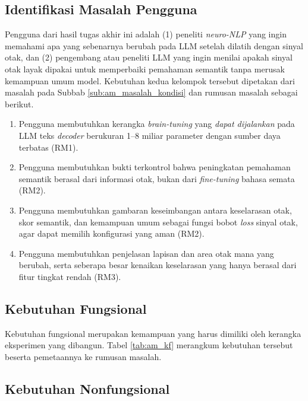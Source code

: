   \subsection{Identifikasi Masalah Pengguna}
  \label{sub:am_pengguna}

  Pengguna dari hasil tugas akhir ini adalah (1) peneliti \textit{neuro-NLP} yang ingin memahami apa yang sebenarnya berubah pada LLM setelah dilatih dengan sinyal otak, dan (2) pengembang atau peneliti LLM yang ingin menilai apakah sinyal otak layak dipakai untuk memperbaiki pemahaman semantik tanpa merusak kemampuan umum model. Kebutuhan kedua kelompok tersebut dipetakan dari masalah pada Subbab \ref{sub:am_masalah_kondisi} dan rumusan masalah sebagai berikut.

  \begin{enumerate}
      \item Pengguna membutuhkan kerangka \textit{brain-tuning} yang \textit{dapat dijalankan} pada LLM teks \textit{decoder} berukuran 1--8 miliar parameter dengan sumber daya terbatas (RM1).
      \item Pengguna membutuhkan bukti terkontrol bahwa peningkatan pemahaman semantik berasal dari informasi otak, bukan dari \textit{fine-tuning} bahasa semata (RM2).
      \item Pengguna membutuhkan gambaran keseimbangan antara keselarasan otak, skor semantik, dan kemampuan umum sebagai fungsi bobot \textit{loss} sinyal otak, agar dapat memilih konfigurasi yang aman (RM2).
      \item Pengguna membutuhkan penjelasan lapisan dan area otak mana yang berubah, serta seberapa besar kenaikan keselarasan yang hanya berasal dari fitur tingkat rendah (RM3).
  \end{enumerate}

  \subsection{Kebutuhan Fungsional}
  \label{sub:am_kf}

  Kebutuhan fungsional merupakan kemampuan yang harus dimiliki oleh kerangka eksperimen yang dibangun. Tabel \ref{tab:am_kf} merangkum kebutuhan tersebut beserta pemetaannya ke rumusan masalah.

  

  \subsection{Kebutuhan Nonfungsional}
  \label{sub:am_knf}

